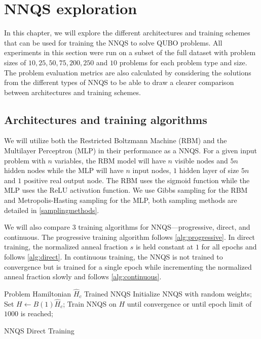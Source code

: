 \chapter{NNQS exploration}\label{nnqsresults}
In this chapter, we will explore the different architectures and training schemes that can be used for training the NNQS to solve QUBO problems. All experiments in this section were run on a subset of the full dataset with problem sizes of $10,25,50,75,200,250$ and $10$ problems for each problem type and size. The problem evaluation metrics are also calculated by considering the solutions from the different types of NNQS to be able to draw a clearer comparison between architectures and training schemes.

\section{Architectures and training algorithms}
We will utilize both the Restricted Boltzmann Machine (RBM) and the Multilayer Perceptron (MLP) in their performance as a NNQS. For a given input problem with $n$ variables, the RBM model will have $n$ visible nodes and $5n$ hidden nodes while the MLP will have $n$ input nodes, $1$ hidden layer of size $5n$ and $1$ positive real output node. The RBM uses the sigmoid function while the MLP uses the ReLU activation function. We use Gibbs sampling for the RBM and Metropolis-Hasting sampling for the MLP, both sampling methods are detailed in \autoref{samplingmethods}.

We will also compare 3 training algorithms for NNQS---progressive, direct, and continuous. The progressive training algorithm follows \autoref{alg:progressive}. In direct training, the normalized anneal fraction $s$ is held constant at $1$ for all epochs and follows \autoref{alg:direct}.  In continuous training, the NNQS is not trained to convergence but is trained for a single epoch while incrementing the normalized anneal fraction slowly and follows \autoref{alg:continuous}.

\begin{algorithm}
    \begin{algorithmic}
    \Require Problem Hamiltonian $\hat{H}_c$
    \Ensure Trained NNQS
    \State Initialize NNQS with random weights;
    \State Set $H \leftarrow B(1)\hat{H}_c$;
    \State Train NNQS on $H$ until convergence or until epoch limit of $1000$ is reached;
    \end{algorithmic}
    \caption{NNQS Direct Training}
    \label{alg:direct}
\end{algorithm}

